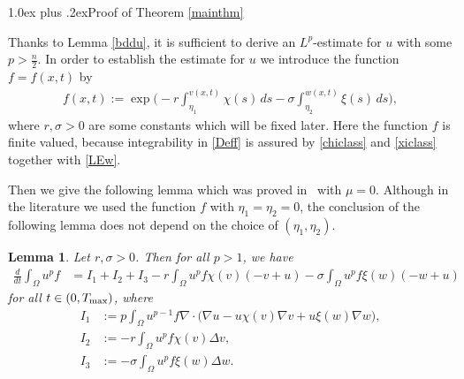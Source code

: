 \documentclass[12pt,reqno,draft]{article}
\makeatletter
\renewcommand{\section}{%
\@startsection{section}{1}{\z@}
{0.5truecm plus -1ex minus -.2ex}%
{1.0ex plus .2ex}{\bfseries\large}}
\numberwithin{equation}{section}
\theoremstyle{theorem}
\newtheorem{lem}[thm]{Lemma}
\theoremstyle{definition}
\newcommand{\Tmax}{T_{\rm max}}
\makeatother
\begin{document}
\section{Proof of Theorem \ref{mainthm}} \label{Sec3}

Thanks to Lemma \ref{bddu}, it is sufficient to derive 
an $L^p$-estimate for $u$ with some $p>\frac{n}{2}$. 
%
 In order to establish the estimate for $u$ 
 we introduce the function 
 $f=f(x,t)$ by
    \begin{align}\label{Deff}
             f(x,t):= \exp\Big(
              -r\int_{\eta_1}^{v(x,t)}\chi(s)\,ds
              -\sigma \int_{\eta_2}^{w(x,t)} \xi(s)\,ds
                             \Big),
    \end{align}
%
where $r, \sigma>0$ are some constants 
which will be fixed later. 
Here the function $f$ is finite valued, 
because integrability in \eqref{Deff} is assured  
by \eqref{chiclass} and \eqref{xiclass} together with \eqref{LEw}. 
\vspace{2mm}
  
Then we give the following lemma which was proved 
in~\cite[Lemma~3.2]{CMY-2020} with $\mu=0$. 
Although in the literature we used the function $f$ with $\eta_1=\eta_2=0$, 
the conclusion of the following lemma does not depend on 
the choice of $(\eta_1, \eta_2)$.

%
\begin{lem} \label{DIupf1}
 Let $r, \sigma>0$. 
 Then for all $p>1$, we have 
%
    \begin{align}\label{est0}
            \frac{d}{dt}\int_\Omega u^pf
        &= I_1+I_2+I_3%
            -r\int_\Omega u^pf\chi(v)(-v+u)
            -\sigma\int_\Omega u^pf\xi(w)(-w+u)
    \end{align}
% 
 for all $t \in (0, \Tmax)$, where
%
    \begin{align*}
             I_1 
        &:=  p\int_\Omega u^{p-1}f\nabla \cdot 
             \Big(\nabla u-u\chi(v)\nabla v+u\xi(w)\nabla w\Big),
    \\[1mm]
             I_2 
        &:=  -r\int_\Omega u^pf\chi(v)\Delta v,
    \\[1mm]
             I_3 
        &:=  -\sigma \int_\Omega u^p f\xi(w)\Delta w.
    \end{align*}
% 
\end{lem}
\end{document}
